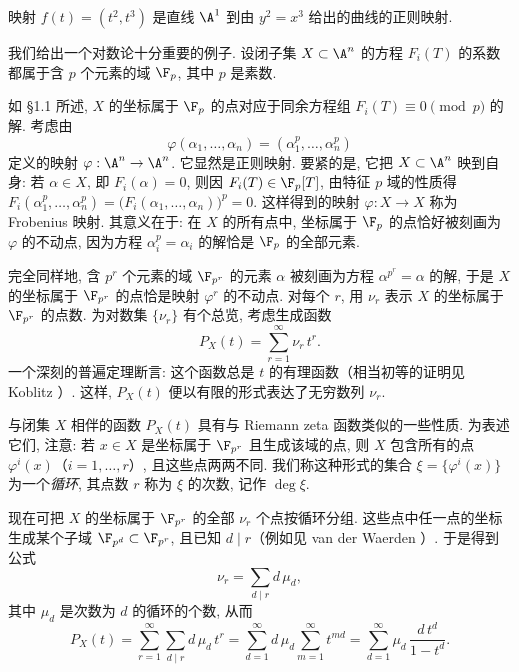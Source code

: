\begin{example}\label{exam:cusp-map}
	映射 $f(t) = (t^2, t^3)$ 是直线 $\A^1$ 到由 $y^2 = x^3$ 给出的曲线的正则映射.
\end{example}

\begin{example}\label{exam:zeta}
	我们给出一个对数论十分重要的例子. 设闭子集 $X \subset \A^n$ 的方程 $F_i(T)$ 的系数都属于含 $p$ 个元素的域 $\F_p$, 其中 $p$ 是素数.

	如 §1.1 所述, $X$ 的坐标属于 $\F_p$ 的点对应于同余方程组 $F_i(T) \equiv 0 \pmod{p}$ 的解. 考虑由
	\[
		\varphi(\alpha_1, \ldots, \alpha_n) = (\alpha_1^p, \ldots, \alpha_n^p)
	\]
	定义的映射 $\varphi: \A^n \to \A^n$. 它显然是正则映射. 要紧的是, 它把 $X \subset \A^n$ 映到自身: 若 $\alpha \in X$, 即 $F_i(\alpha) = 0$, 则因 $F_i(T) \in \F_p[T]$, 由特征 $p$ 域的性质得 $F_i(\alpha_1^p, \ldots, \alpha_n^p) = \bigl( F_i(\alpha_1, \ldots, \alpha_n) \bigr)^p = 0$. 这样得到的映射 $\varphi: X \to X$ 称为 Frobenius 映射. 其意义在于: 在 $X$ 的所有点中, 坐标属于 $\F_p$ 的点恰好被刻画为 $\varphi$ 的不动点, 因为方程 $\alpha_i^p = \alpha_i$ 的解恰是 $\F_p$ 的全部元素.

	完全同样地, 含 $p^r$ 个元素的域 $\F_{p^r}$ 的元素 $\alpha$ 被刻画为方程 $\alpha^{p^r} = \alpha$ 的解, 于是 $X$ 的坐标属于 $\F_{p^r}$ 的点恰是映射 $\varphi^r$ 的不动点. 对每个 $r$, 用 $\nu_r$ 表示 $X$ 的坐标属于 $\F_{p^r}$ 的点数. 为对数集 $\{\nu_r\}$ 有个总览, 考虑生成函数
	\[
		P_X(t) = \sum_{r=1}^{\infty} \nu_r\, t^r.
	\]
	一个深刻的普遍定理断言: 这个函数总是 $t$ 的有理函数（相当初等的证明见 Koblitz \cite[第 V 章]{koblitz1984}）. 这样, $P_X(t)$ 便以有限的形式表达了无穷数列 $\nu_r$.

	与闭集 $X$ 相伴的函数 $P_X(t)$ 具有与 Riemann zeta 函数类似的一些性质. 为表述它们, 注意: 若 $x \in X$ 是坐标属于 $\F_{p^r}$ 且生成该域的点, 则 $X$ 包含所有的点 $\varphi^i(x)$（$i = 1, \ldots, r$）, 且这些点两两不同. 我们称这种形式的集合 $\xi = \{\varphi^i(x)\}$ 为一个\emph{循环}, 其点数 $r$ 称为 $\xi$ 的次数, 记作 $\deg \xi$.

	现在可把 $X$ 的坐标属于 $\F_{p^r}$ 的全部 $\nu_r$ 个点按循环分组. 这些点中任一点的坐标生成某个子域 $\F_{p^d} \subset \F_{p^r}$, 且已知 $d \mid r$（例如见 van der Waerden \cite[第 6.7 节例 6.23]{vdw1991}）. 于是得到公式
	\[
		\nu_r = \sum_{d \mid r} d\, \mu_d,
	\]
	其中 $\mu_d$ 是次数为 $d$ 的循环的个数, 从而
	\begin{equation}
		\label{eq:1.18}
		P_X(t) = \sum_{r=1}^{\infty} \sum_{d \mid r} d\, \mu_d\, t^r = \sum_{d=1}^{\infty} d\, \mu_d \sum_{m=1}^{\infty} t^{md} = \sum_{d=1}^{\infty} \mu_d\, \frac{d\, t^d}{1 - t^d}.
	\end{equation}


\end{example}
